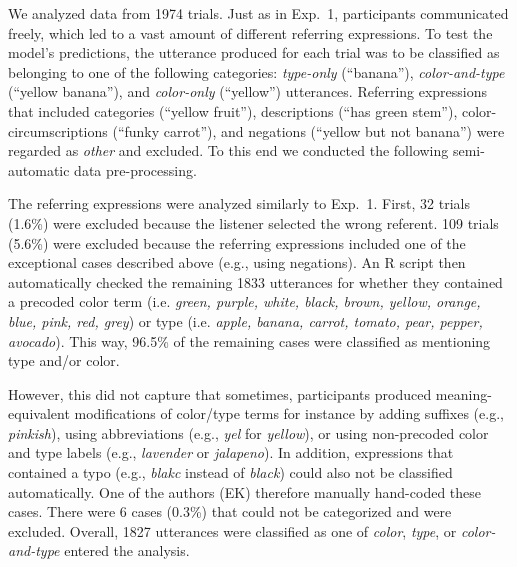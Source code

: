 \documentclass[11pt]{article}
\begin{document}
We analyzed data from 1974 trials. Just as in Exp.~1, participants communicated freely, which led to a vast amount of different referring expressions. To test the model's predictions, the utterance produced for each trial was to be classified as belonging to one of the following categories: \textit{type-only} (``banana''), \textit{color-and-type} (``yellow banana''), and \textit{color-only} (``yellow'') utterances. Referring expressions that included categories (``yellow fruit''), descriptions (``has green stem''), color-circumscriptions (``funky carrot''), and negations (``yellow but not banana'') were regarded as \textit{other} and excluded. To this end we conducted the following semi-automatic data pre-processing.

The referring expressions were analyzed similarly to Exp.~1. First, 32 trials (1.6\%) were excluded because the listener selected the wrong referent. 109 trials (5.6\%) were excluded because the referring expressions included one of the exceptional cases described above (e.g., using negations). 
An R script then automatically checked the remaining 1833 utterances for whether they contained a precoded color term (i.e. \emph{green, purple, white, black, brown, yellow, orange, blue, pink, red, grey}) or type (i.e. \emph{apple, banana, carrot, tomato, pear, pepper, avocado}). This way, 96.5\% of the remaining cases were classified as mentioning type and/or color. 

However, this did not capture that sometimes, participants produced meaning-equivalent modifications of color/type terms for instance by adding suffixes (e.g., \emph{pinkish}), using abbreviations (e.g., \emph{yel} for \emph{yellow}), or using non-precoded color and type labels (e.g., \emph{lavender} or \emph{jalapeno}). In addition, expressions that contained a typo (e.g., \emph{blakc} instead of \emph{black}) could also not be classified automatically. One of the authors (EK) therefore manually hand-coded these cases.
There were 6 cases (0.3\%) that could not be categorized and were excluded.
Overall, 1827 utterances were classified as one of \emph{color}, \emph{type}, or \emph{color-and-type} entered the analysis.
\end{document}
